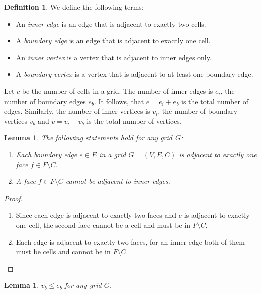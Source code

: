 \documentclass{IOS-Book-Article}
\theoremstyle{plain}
\newtheorem{lemma}[theorem]{Lemma}
\theoremstyle{definition}
\newtheorem{definition}{Definition}[section]
\begin{document}
\begin{definition} We define the following terms:
	\begin{itemize}
		\item An \emph{inner edge} is an edge that is adjacent to exactly two cells.
		\item A \emph{boundary edge} is an edge that is adjacent to exactly one cell.
		\item An \emph{inner vertex} is a vertex that is adjacent to inner edges only.
		\item A \emph{boundary vertex} is a vertex that is adjacent to at least one boundary edge.
	\end{itemize}
\end{definition}

Let $c$ be the number of cells in a grid.
The number of inner edges is $e_i$, the number of boundary edges $e_b$.
It follows, that $e = e_i + e_b$ is the total number of edges.
Similarly, the number of inner vertices is $v_i$, the number of boundary vertices $v_b$
and $v = v_i + v_b$ is the total number of vertices.

\begin{lemma} \label{lem.bndface} The following statements hold for any grid $G$:
\begin{enumerate}
	\item Each boundary edge $e \in E$ in a grid $G = (V, E, C)$ is adjacent to exactly one face $f \in F \setminus C$.
	\item A face $f \in F \setminus C$ cannot be adjacent to inner edges.
\end{enumerate}
\end{lemma}

\begin{proof}
\begin{enumerate}
	\item Since each edge is adjacent to exactly two faces and $e$ is adjacent to exactly one cell, the second face cannot be a cell and must be in $F \setminus C$.
	\item Each edge is adjacent to exactly two faces, for an inner edge both of them must be cells and cannot be in $F \setminus C$.
\end{enumerate}
\end{proof}

\begin{lemma} \label{lem.bnd} $v_b \leq e_b$ for any grid $G$.
\end{lemma}
\end{document}
